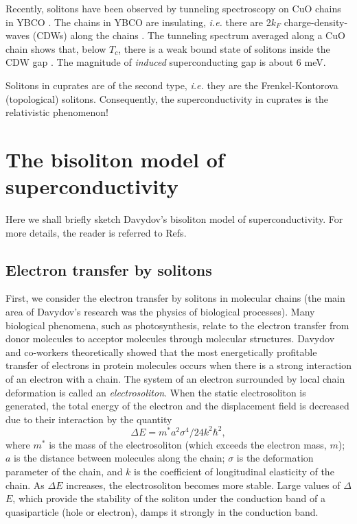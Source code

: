 Recently, solitons have been observed by tunneling spectroscopy on CuO 
chains in YBCO \cite{deLozanne}. The chains in YBCO are insulating, {\em i.e.} 
there are 2$k_{F}$ charge-density-waves (CDWs) along the chains 
\cite{Edwards}. The tunneling 
spectrum averaged along a CuO chain shows that, below $T_{c}$, there is a 
weak bound state of solitons inside the CDW gap \cite{note}. The magnitude
of {\em induced} superconducting gap is about 6 meV.

Solitons in cuprates are of the second type, {\em i.e.} they are the 
Frenkel-Kontorova (topological) solitons. Consequently, the 
superconductivity in cuprates is the relativistic phenomenon!

\section{The bisoliton model of superconductivity}

Here we shall briefly sketch Davydov's bisoliton model 
of superconductivity. For more details, the reader is referred to 
Refs\cite{Davydov2,Davydov3}.  

\subsection{Electron transfer by solitons}

First, we consider the electron transfer by solitons in molecular chains
(the main area of Davydov's research was the physics of biological 
processes).
Many biological phenomena, such as photosynthesis, relate to the electron
transfer from donor molecules to acceptor molecules through molecular 
structures. Davydov and co-workers theoretically showed that the
most energetically profitable transfer of electrons in protein molecules
occurs when there is a strong interaction of an electron with a chain. 
The system of an electron surrounded by local chain deformation is called 
an {\em electrosoliton}. When the static electrosoliton is generated, the 
total energy of the electron and the displacement field is decreased due 
to their interaction by the quantity 
\begin{equation}
\Delta E = m^{\ast}a^{2}\sigma^{4}/24k^{2}\hbar^{2},
\end{equation}
where $m^{\ast}$ is the mass of the electrosoliton (which exceeds the 
electron mass, $m$); $a$ is the distance 
between molecules along the chain; $\sigma$ is the deformation parameter 
of the chain, and $k$ is the coefficient of longitudinal elasticity of the chain. 
As $\Delta$$E$ increases, the electrosoliton becomes more stable. Large 
values of $\Delta$$E$, which provide the stability of the soliton under the 
conduction band of a quasiparticle (hole or electron), damps it strongly in 
the conduction band.

